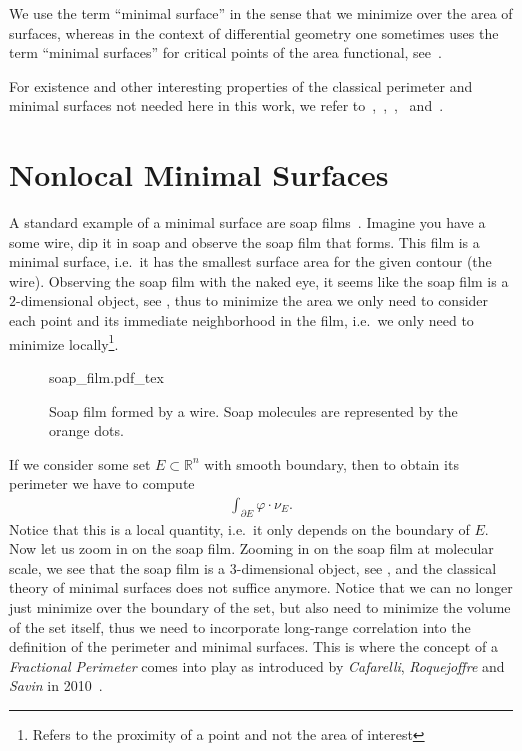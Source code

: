 \begin{note}
	We use the term \enquote{minimal surface} in the sense that we minimize over the area of surfaces,
	whereas in the context of differential geometry one sometimes uses the term \enquote{minimal
		surfaces} for critical points of the area functional, see~\cite{meeks2012survey}.
\end{note}

For existence and other interesting properties of the classical perimeter and minimal surfaces not
needed here in this work, we refer
to~\cite{Cozzi2017},~\cite{Evans2015},~\cite{Giusti1984},~\cite{Grinfeld2013} and~\cite{Maggi_2012}.

\section{Nonlocal Minimal Surfaces}
\label{sec:002}

A standard example of a minimal surface are soap films~\cite{Serra2023}. Imagine you have a some
wire, dip it in soap and observe the soap film that forms. This film is a minimal surface, i.e.\ it
has the smallest surface area for the given contour (the wire). Observing the soap film with the
naked eye, it seems like the soap film is a \( 2 \)-dimensional object, see , thus to
minimize the area we only need to consider each point and its immediate neighborhood in the film,
i.e.\ we only need to minimize locally\footnote{Refers to the proximity of a point and not the area
	of interest}.
\begin{figure}[ht]
	\centering
	\def\svgscale{1}
	{soap_film.pdf_tex}
	\caption{Soap film formed by a wire. Soap molecules are represented by the orange dots.}
	\label{fig:002}
\end{figure}
If we consider some set \( E \subset \mathbb{R}^n \) with smooth
boundary, then to obtain its perimeter we have to compute
\begin{gather*}
	\int_{\partial E} \varphi \cdot \nu_E.
\end{gather*}
Notice that this is a local quantity, i.e.\ it only depends on the boundary of \( E \). Now let us
zoom in on the soap film. Zooming in on the soap film at molecular scale, we see that the soap film
is a \( 3 \)-dimensional object, see , and the classical theory of minimal surfaces
does not suffice anymore. Notice that we can no longer just minimize over the boundary of the set,
but also need to minimize the volume of the set itself, thus we need to incorporate long-range
correlation into the definition of the perimeter and minimal surfaces. This is where the concept of
a \emph{Fractional Perimeter} comes into play as introduced by \emph{Cafarelli}, \emph{Roquejoffre}
and \emph{Savin} in 2010~\cite{caffarelli2009nonlocal}.


